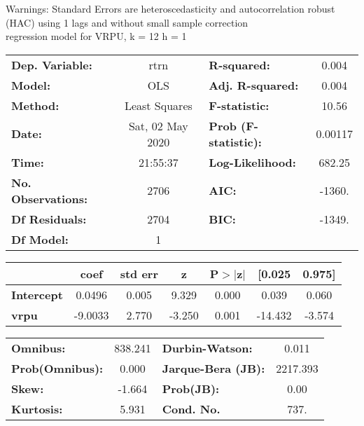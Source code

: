 Warnings: \newline
 [1] Standard Errors are heteroscedasticity and autocorrelation robust (HAC) using 1 lags and without small sample correction\\ 

regression model for VRPU, k = 12 h = 1\begin{center}
\begin{tabular}{lclc}
\toprule
\textbf{Dep. Variable:}    &       rtrn       & \textbf{  R-squared:         } &     0.004   \\
\textbf{Model:}            &       OLS        & \textbf{  Adj. R-squared:    } &     0.004   \\
\textbf{Method:}           &  Least Squares   & \textbf{  F-statistic:       } &     10.56   \\
\textbf{Date:}             & Sat, 02 May 2020 & \textbf{  Prob (F-statistic):} &  0.00117    \\
\textbf{Time:}             &     21:55:37     & \textbf{  Log-Likelihood:    } &    682.25   \\
\textbf{No. Observations:} &        2706      & \textbf{  AIC:               } &    -1360.   \\
\textbf{Df Residuals:}     &        2704      & \textbf{  BIC:               } &    -1349.   \\
\textbf{Df Model:}         &           1      & \textbf{                     } &             \\
\bottomrule
\end{tabular}
\begin{tabular}{lcccccc}
                   & \textbf{coef} & \textbf{std err} & \textbf{z} & \textbf{P$> |$z$|$} & \textbf{[0.025} & \textbf{0.975]}  \\
\midrule
\textbf{Intercept} &       0.0496  &        0.005     &     9.329  &         0.000        &        0.039    &        0.060     \\
\textbf{vrpu}      &      -9.0033  &        2.770     &    -3.250  &         0.001        &      -14.432    &       -3.574     \\
\bottomrule
\end{tabular}
\begin{tabular}{lclc}
\textbf{Omnibus:}       & 838.241 & \textbf{  Durbin-Watson:     } &    0.011  \\
\textbf{Prob(Omnibus):} &   0.000 & \textbf{  Jarque-Bera (JB):  } & 2217.393  \\
\textbf{Skew:}          &  -1.664 & \textbf{  Prob(JB):          } &     0.00  \\
\textbf{Kurtosis:}      &   5.931 & \textbf{  Cond. No.          } &     737.  \\
\bottomrule
\end{tabular}
\end{center}

